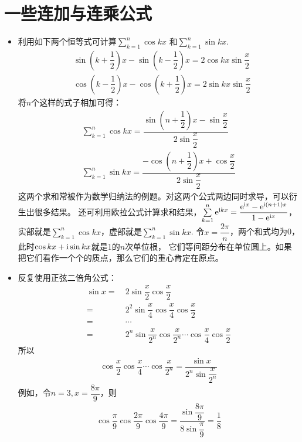 \section{一些连加与连乘公式}
\begin{itemize}[leftmargin=\inteval{\myitemleftmargin}pt,itemsep=
   \inteval{\myitemitempsep}pt,topsep=\inteval{\myitemtopsep}pt]
\item 利用如下两个恒等式可计算$ \sum\limits_{k=1}^{n}\cos kx $
和$ \sum\limits_{k=1}^{n}\sin kx $. 
\begin{align*}
    &\sin\left(k+\dfrac{1}{2}\right) x-\sin\left(k-\dfrac{1}{2}\right) x=2\cos kx\sin \dfrac{x}{2} \\
    &\cos\left(k-\dfrac{1}{2}\right) x-\cos\left(k+\dfrac{1}{2}\right) x=2\sin kx\sin \dfrac{x}{2} 	 		
\end{align*}
将$ n $个这样的式子相加可得：
\begin{align}
    \sum_{k=1}^{n}\cos kx=\dfrac{\sin\left( n+\dfrac{1}{2}\right) x-\sin 
        \dfrac{x}{2}}{2\sin \dfrac{x}{2}} \label{余弦等差连加} \\
    \sum_{k=1}^{n}\sin kx=\dfrac{-\cos\left( n+\dfrac{1}{2}\right) x+\cos 
        \dfrac{x}{2}}{2\sin \dfrac{x}{2}}	\label{正弦等差连加}
\end{align}
这两个求和常被作为数学归纳法的例题。对这两个公式两边同时求导，可以衍生出很多结果。
还可利用欧拉公式计算求和结果，$ \sum\limits_{k=1}^{n}\mathrm{e}^{\mathrm{i} kx}=\dfrac{\mathrm{e}^{\mathrm{i} x}-\mathrm{e}^{\mathrm{i}(n+1)x}}{1-\mathrm{e}^{\mathrm{i} x}} $，
实部就是$ \sum\limits_{k=1}^{n}\cos kx $，虚部就是$ \sum\limits_{k=1}^{n}\sin kx $. 
令$ x=\dfrac{2\pi}{n} $，两个和式均为0，此时$ \cos kx+\mathrm{i}\sin kx $就是1的$ n $次单位根，
它们等间距分布在单位圆上。如果把它们看作一个个的质点，那么它们的重心肯定在原点。

\item 反复使用正弦二倍角公式：
\begin{align*}
    \sin x =&\ 2\sin\dfrac{x}{2} \cos\dfrac{x}{2} \\
    =&\ 2^2 \sin\dfrac{x}{4} \cos\dfrac{x}{4}  \cos\dfrac{x}{2} \\
    =&\  \cdots \\
    =&\  2^n \sin\dfrac{x}{2^n}\cos\dfrac{x}{2^n} \cdots \cos\dfrac{x}{4}\cos\dfrac{x}{2}     
\end{align*}
所以
\begin{align}\label{余弦等比连乘}
    \cos\dfrac{x}{2} \cos\dfrac{x}{4}\cdots  \cos\dfrac{x}{2^n}
    =\dfrac{\sin x}{2^n \sin\dfrac{x}{2^n}}
\end{align}
例如，令$ n=3,x=\dfrac{8\pi}{9} $，则
\begin{align*}
    \cos\dfrac{\pi}{9}\cos\dfrac{2\pi}{9}\cos\dfrac{4\pi}{9}
    =\dfrac{\sin\dfrac{8\pi}{9}}{8\sin\dfrac{\pi}{9}}=\dfrac{1}{8}
\end{align*}


\end{itemize}
